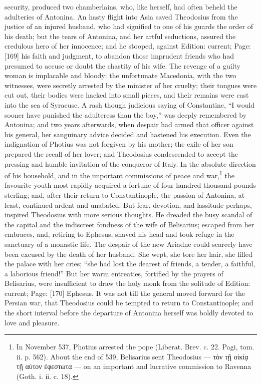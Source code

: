 security, produced two chamberlains, who, like herself, had often beheld the adulteries of Antonina. An hasty flight into Asia saved Theodosius from the justice of an injured husband, who had signified to one of his guards the order of his death; but the tears of Antonina, and her artful seductions, assured the credulous hero of her innocence; and he stooped, against Edition: current; Page: [169] his faith and judgment, to abandon those imprudent friends who had presumed to accuse or doubt the chastity of his wife. The revenge of a guilty woman is implacable and bloody: the unfortunate Macedonia, with the two witnesses, were secretly arrested by the minister of her cruelty; their tongues were cut out, their bodies were hacked into small pieces, and their remains were cast into the sea of Syracuse. A rash though judicious saying of Constantine, \texthebrew{“}I would sooner have punished the adulteress than the boy,\texthebrew{}” was deeply remembered by Antonina; and two years afterwards, when despair had armed that officer against his general, her sanguinary advice decided and hastened his execution. Even the indignation of Photius was not forgiven by his mother; the exile of her son prepared the recall of her lover; and Theodosius condescended to accept the pressing and humble invitation of the conqueror of Italy. In the absolute direction of his household, and in the important commissions of peace and war,\footnote{In November 537, Photius arrested the pope (Liberat. Brev. c. 22. Pagi, tom. ii. p. 562). About the end of 539, Belisarius sent Theodosius \texthebrew{—} \textgreek{τ\texthebrew{ὸ}ν τ\texthebrew{ῇ} ο\texthebrew{ἰ}κί\texthebrew{ᾳ} τ\texthebrew{ῇ} α\texthebrew{ὐ}τον \texthebrew{ἐ}φεστωτα} \texthebrew{—} on an important and lucrative commission to Ravenna (Goth. i. ii. c. 18).} the favourite youth most rapidly acquired a fortune of four hundred thousand pounds sterling; and, after their return to Constantinople, the passion of Antonina, at least, continued ardent and unabated. But fear, devotion, and lassitude perhaps, inspired Theodosius with more serious thoughts. He dreaded the busy scandal of the capital and the indiscreet fondness of the wife of Belisarius; escaped from her embraces, and, retiring to Ephesus, shaved his head and took refuge in the sanctuary of a monastic life. The despair of the new Ariadne could scarcely have been excused by the death of her husband. She wept, she tore her hair, she filled the palace with her cries; \texthebrew{“}she had lost the dearest of friends, a tender, a faithful, a laborious friend!\texthebrew{}” But her warm entreaties, fortified by the prayers of Belisarius, were insufficient to draw the holy monk from the solitude of Edition: current; Page: [170] Ephesus. It was not till the general moved forward for the Persian war, that Theodosius could be tempted to return to Constantinople; and the short interval before the departure of Antonina herself was boldly devoted to love and pleasure.


